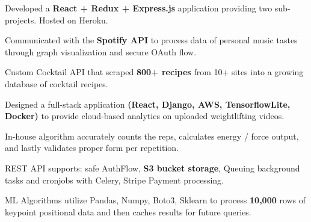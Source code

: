 

\begin{cventries}

  \cventry
    {
    }
    {}
    {}
    {}
    {
     \begin{cvitems} %
        \item {Developed a \textbf{React + Redux + Express.js} application providing two sub-projects. Hosted on Heroku.}
        \item{Communicated with the \textbf{Spotify API} to process data of personal music tastes through graph visualization and secure OAuth flow.}
        \item{Custom Cocktail API that scraped \textbf{800+ recipes} from 10+ sites into a growing database of cocktail recipes.}
      \end{cvitems}
    }

  \cventry
    {
    } %
    {} %
    {} %
    {} %
    {
      \begin{cvitems} %
        \item {Designed a full-stack application \textbf{(React, Django, AWS, TensorflowLite, Docker)} to provide cloud-based analytics on uploaded weightlifting videos.}
        \item{In-house algorithm accurately counts the reps, calculates energy / force output, and lastly validates proper form per repetition.}
        \item{REST API supports: safe AuthFlow, \textbf{S3 bucket storage}, Queuing background tasks and cronjobs with Celery, Stripe Payment processing.}
        \item{ML Algorithms utilize Pandas, Numpy, Boto3, Sklearn to process \textbf{10,000} rows of keypoint positional data and then caches results for future queries.}
      \end{cvitems}
    }



\end{cventries}

